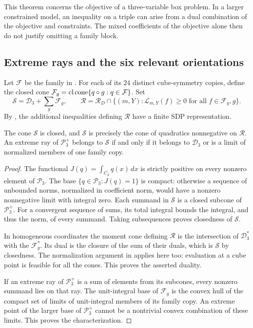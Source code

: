 This theorem concerns the objective of a three-variable box problem. In a
larger constrained model, an inequality on a triple can arise from a dual
combination of the objective and constraints. The mixed coefficients of
the objective alone then do not justify omitting a family block.

\subsection{Extreme rays and the six relevant orientations}

Let $\mathcal F$ be the family in . For each of its
$24$ distinct cube-symmetry copies, define the closed cone
$\mathcal F_g=\operatorname{cl}\operatorname{cone}\{q\circ g:q\in\mathcal F\}$. Set
\begin{equation}\label{eq:three:combined-cone}
 \mathcal S=\mathcal D_3+\sum_g\mathcal F_g,
 \qquad
 \mathcal R=\mathcal R_D\cap\{(m,Y):\mathcal L_{m,Y}(f)\ge0\text{ for all }f\in \mathcal F_g, g\}.
\end{equation}
By , the additional inequalities defining $\mathcal R$ have a
finite SDP representation.

\begin{lemma}\label{three:sum}
The cone $\mathcal S$ is closed, and $\mathcal S$ is precisely the cone of quadratics
nonnegative on $\mathcal R$. An extreme ray of $\mathcal P_3^+$ belongs to $\mathcal S$ if
and only if it belongs to $\mathcal D_3$ or is a limit of normalized members of one
family copy.
\end{lemma}
\begin{proof}
The functional $J(q)=\int_{C_3}q(x)\,dx$ is strictly positive on every
nonzero element of $\mathcal P_3$. The base
$\{q\in\mathcal P_3:J(q)=1\}$ is compact: otherwise a sequence of
unbounded norms, normalized in coefficient norm, would have a nonzero
nonnegative limit with integral zero. Each summand in $\mathcal S$ is a closed
subcone of $\mathcal P_3^+$. For a convergent sequence of sums, its total
integral bounds the integral, and thus the norm, of every summand. Taking
subsequences proves closedness of $\mathcal S$.

In homogeneous coordinates the moment cone defining $\mathcal R$ is the
intersection of $\mathcal D_3^*$ with the $\mathcal F_g^*$. Its dual is the closure of the
sum of their duals, which is $\mathcal S$ by closedness. The normalization argument
in  applies here too: evaluation at a cube point is
feasible for all the cones. This proves the asserted duality.

If an extreme ray of $\mathcal P_3^+$ is a sum of elements from its
subcones, every nonzero summand lies on that ray. The unit-integral base
of $\mathcal F_g$ is the convex hull of the compact set of limits of
unit-integral members of its family copy. An extreme point of the larger
base of $\mathcal P_3^+$ cannot be a nontrivial convex combination of
these limits. This proves the characterization.
\end{proof}

